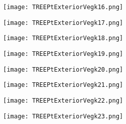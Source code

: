 \documentclass[pdf]{beamer}
\begin{document}
\begin{frame}
\begin{figure}[!h]
\centering
\texttt{[image: TREEPtExteriorVegk16.png]}
\end{figure}
\end{frame}

\begin{frame}
\begin{figure}[!h]
\centering
\texttt{[image: TREEPtExteriorVegk17.png]}
\end{figure}
\end{frame}

\begin{frame}
\begin{figure}[!h]
\centering
\texttt{[image: TREEPtExteriorVegk18.png]}
\end{figure}
\end{frame}

\begin{frame}
\begin{figure}[!h]
\centering
\texttt{[image: TREEPtExteriorVegk19.png]}
\end{figure}
\end{frame}

\begin{frame}
\begin{figure}[!h]
\centering
\texttt{[image: TREEPtExteriorVegk20.png]}
\end{figure}
\end{frame}

\begin{frame}
\begin{figure}[!h]
\centering
\texttt{[image: TREEPtExteriorVegk21.png]}
\end{figure}
\end{frame}

\begin{frame}
\begin{figure}[!h]
\centering
\texttt{[image: TREEPtExteriorVegk22.png]}
\end{figure}
\end{frame}

\begin{frame}
\begin{figure}[!h]
\centering
\texttt{[image: TREEPtExteriorVegk23.png]}
\end{figure}
\end{frame}
\end{document}
